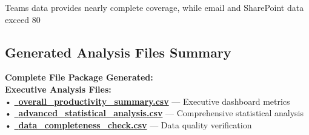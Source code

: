 \documentclass[12pt,a4paper]{article}
\begin{document}
Teams data provides nearly complete coverage, while email and SharePoint data exceed 80%

\subsection{Generated Analysis Files Summary}

\begin{resourcebox}
\textbf{\faFolder \quad Complete File Package Generated:}\\[0.8em]

\textbf{Executive Analysis Files:}\\
• \textcolor{mediumGray}{\href{https://fixysaskihumorizijuv.supabase.co/storage/v1/object/public/research-files/74906882-50ed-4947-8d41-ff2fcf4bebf3-overall_productivity_summary.csv?download=}{{\normalsize\faClipboard}\, \textbf{overall\_productivity\_summary.csv}}} — Executive dashboard metrics\\
• \textcolor{accentBlue}{\href{https://fixysaskihumorizijuv.supabase.co/storage/v1/object/public/research-files/6bc2ed7c-9918-4171-9b19-2d31fb67df5d-advanced_statistical_analysis.csv?download=}{{\normalsize\faChartLine}\, \textbf{advanced\_statistical\_analysis.csv}}} — Comprehensive statistical analysis\\
• \textcolor{successGreen}{\href{https://fixysaskihumorizijuv.supabase.co/storage/v1/object/public/research-files/28c816b5-f241-4749-80a7-f8e75b78f052-data_completeness_check.csv?download=}{{\normalsize\faShieldAlt}\, \textbf{data\_completeness\_check.csv}}} — Data quality verification\\[0.5em]


\end{resourcebox}
\end{document}

